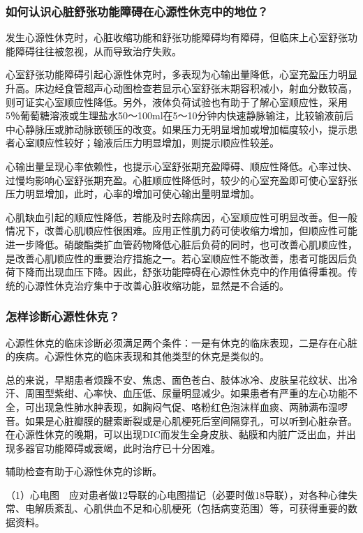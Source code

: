 \subsubsection{如何认识心脏舒张功能障碍在心源性休克中的地位？}

发生心源性休克时，心脏收缩功能和舒张功能障碍均有障碍，但临床上心室舒张功能障碍往往被忽视，从而导致治疗失败。

心室舒张功能障碍引起心源性休克时，多表现为心输出量降低，心室充盈压力明显升高。床边经食管超声心动图检查若显示心室舒张末期容积减小，射血分数较高，则可证实心室顺应性降低。另外，液体负荷试验也有助于了解心室顺应性，采用5％葡萄糖溶液或生理盐水50～100ml在5～10分钟内快速静脉输注，比较输液前后中心静脉压或肺动脉嵌顿压的改变。如果压力无明显增加或增加幅度较小，提示患者心室顺应性较好；输液后压力明显增加，则提示顺应性较差。

心输出量呈现心率依赖性，也提示心室舒张期充盈障碍、顺应性降低。心率过快、过慢均影响心室舒张期充盈。心脏顺应性降低时，较少的心室充盈即可使心室舒张压力明显增加，此时，心率的增加可使心输出量明显增加。

心肌缺血引起的顺应性降低，若能及时去除病因，心室顺应性可明显改善。但一般情况下，改善心肌顺应性很困难。应用正性肌力药可使收缩力增加，但顺应性可能进一步降低。硝酸酯类扩血管药物降低心脏后负荷的同时，也可改善心肌顺应性，是改善心肌顺应性的重要治疗措施之一。若心室顺应性不能改善，患者可能因后负荷下降而出现血压下降。因此，舒张功能障碍在心源性休克中的作用值得重视。传统的心源性休克治疗集中于改善心脏收缩功能，显然是不合适的。

\subsubsection{怎样诊断心源性休克？}

心源性休克的临床诊断必须满足两个条件：一是有休克的临床表现，二是存在心脏的疾病。心源性休克的临床表现和其他类型的休克是类似的。

总的来说，早期患者烦躁不安、焦虑、面色苍白、肢体冰冷、皮肤呈花纹状、出冷汗、周围型紫绀、心率快、血压低、尿量明显减少。如果患者有严重的左心功能不全，可出现急性肺水肿表现，如胸闷气促、咯粉红色泡沫样血痰、两肺满布湿啰音。如果是心脏瓣膜的腱索断裂或是心肌梗死后室间隔穿孔，可以听到心脏杂音。在心源性休克的晚期，可以出现DIC而发生全身皮肤、黏膜和内脏广泛出血，并出现多器官功能障碍或衰竭，此时治疗已十分困难。

辅助检查有助于心源性休克的诊断。

（1）心电图　应对患者做12导联的心电图描记（必要时做18导联），对各种心律失常、电解质紊乱、心肌供血不足和心肌梗死（包括病变范围）等，可获得重要的数据资料。

